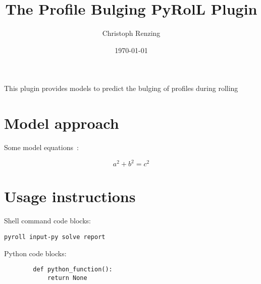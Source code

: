 \documentclass[11pt]{PyRollDocs}
\begin{document}
    \title{The Profile Bulging PyRolL Plugin}
    \author{Christoph Renzing}
    \date{\today}

    \maketitle

    This plugin provides models to predict the bulging of profiles during rolling

    \section{Model approach}\label{sec:model-approach}

    Some model equations~\cite{article1}:

    \[
        a^2 + b^2 = c^2
    \]


    \section{Usage instructions}\label{sec:usage-instructions}

    Shell command code blocks:

    \begin{verbatim}
pyroll input-py solve report
    \end{verbatim}

    Python code blocks:

    \begin{verbatim}
        def python_function():
            return None
    \end{verbatim}

    \printbibliography
\end{document}
